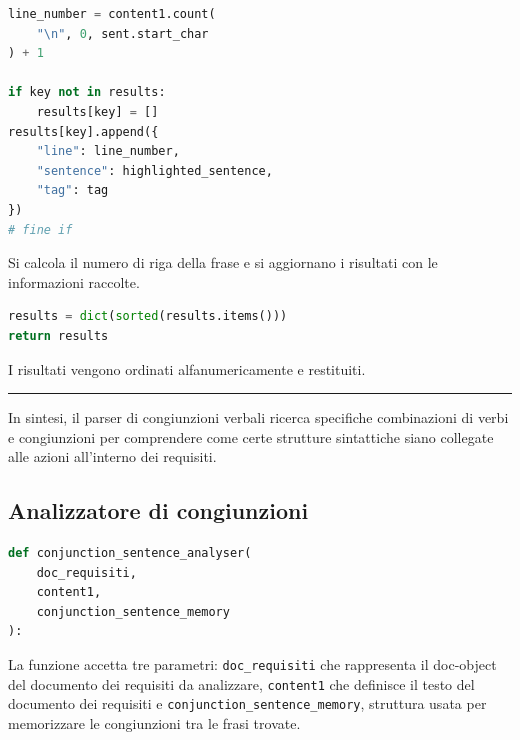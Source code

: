 \documentclass[12pt]{report}
\begin{document}
\begin{mdframed}
\small
\begin{lstlisting}[language=Python]
line_number = content1.count(
    "\n", 0, sent.start_char
) + 1

if key not in results:
    results[key] = []
results[key].append({
    "line": line_number,
    "sentence": highlighted_sentence,
    "tag": tag
})
# fine if
\end{lstlisting}
\end{mdframed}

\noindent Si calcola il numero di riga della frase e si aggiornano i risultati con le informazioni raccolte.


\begin{mdframed}
\small
\begin{lstlisting}[language=Python]
results = dict(sorted(results.items()))
return results
\end{lstlisting}
\end{mdframed}

\noindent I risultati vengono ordinati alfanumericamente e restituiti.


{\centering \rule{0.5\linewidth}{0.1pt} \par\vspace{0.25cm}}

In sintesi, il \textsf{parser di congiunzioni verbali} ricerca specifiche combinazioni di verbi e congiunzioni per comprendere come certe strutture sintattiche siano collegate alle azioni all'interno dei requisiti.


\subsection{Analizzatore di congiunzioni}

\begin{mdframed}
\small
\begin{lstlisting}[language=Python]
def conjunction_sentence_analyser(
    doc_requisiti,
    content1,
    conjunction_sentence_memory
):
\end{lstlisting}
\end{mdframed}

\noindent La funzione accetta tre parametri: \texttt{doc\_requisiti} che rappresenta il doc-object del documento dei requisiti da analizzare, \texttt{content1} che definisce il testo del documento dei requisiti e \texttt{conjunction\_sentence\_memory}, struttura usata per memorizzare le congiunzioni tra le frasi trovate.
\end{document}
